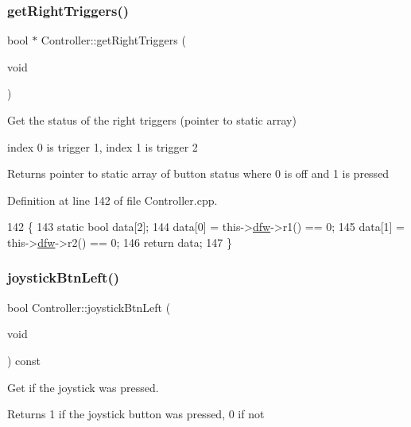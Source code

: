\subsubsection{\texorpdfstring{get\+Right\+Triggers()}{getRightTriggers()}}
{\footnotesize\ttfamily bool $\ast$ Controller\+::get\+Right\+Triggers (\begin{DoxyParamCaption}\item[{void}]{ }\end{DoxyParamCaption})}



Get the status of the right triggers (pointer to static array) 

index 0 is trigger 1, index 1 is trigger 2 \begin{DoxyReturn}{Returns}
pointer to static array of button status where 0 is off and 1 is pressed 
\end{DoxyReturn}


Definition at line 142 of file Controller.\+cpp.


\begin{DoxyCode}
142                                    \{
143     \textcolor{keyword}{static} \textcolor{keywordtype}{bool} data[2];
144     data[0] = this->\hyperlink{class_controller_af4793ccbf2ecdbfcdb9359bd32b6e8cf}{dfw}->r1() == 0;
145     data[1] = this->\hyperlink{class_controller_af4793ccbf2ecdbfcdb9359bd32b6e8cf}{dfw}->r2() == 0;
146     \textcolor{keywordflow}{return} data;
147 \}
\end{DoxyCode}
\mbox{\label{class_controller_a64e858b7a8d6add4caf751887ea35a42}} 
\subsubsection{\texorpdfstring{joystick\+Btn\+Left()}{joystickBtnLeft()}}
{\footnotesize\ttfamily bool Controller\+::joystick\+Btn\+Left (\begin{DoxyParamCaption}\item[{void}]{ }\end{DoxyParamCaption}) const}



Get if the joystick was pressed. 

\begin{DoxyReturn}{Returns}
1 if the joystick button was pressed, 0 if not 
\end{DoxyReturn}


